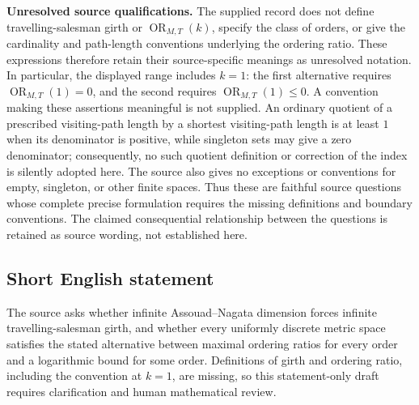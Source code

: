 \documentclass[11pt]{article}
\begin{document}
\textbf{Unresolved source qualifications.} The supplied record does not define travelling-salesman girth or \(\operatorname{OR}_{M,T}(k)\), specify the class of orders, or give the cardinality and path-length conventions underlying the ordering ratio. These expressions therefore retain their source-specific meanings as unresolved notation. In particular, the displayed range includes \(k=1\): the first alternative requires \(\operatorname{OR}_{M,T}(1)=0\), and the second requires \(\operatorname{OR}_{M,T}(1)\leq0\). A convention making these assertions meaningful is not supplied. An ordinary quotient of a prescribed visiting-path length by a shortest visiting-path length is at least \(1\) when its denominator is positive, while singleton sets may give a zero denominator; consequently, no such quotient definition or correction of the index is silently adopted here. The source also gives no exceptions or conventions for empty, singleton, or other finite spaces. Thus these are faithful source questions whose complete precise formulation requires the missing definitions and boundary conventions. The claimed consequential relationship between the questions is retained as source wording, not established here.
\subsection{Short English statement}
The source asks whether infinite Assouad--Nagata dimension forces infinite travelling-salesman girth, and whether every uniformly discrete metric space satisfies the stated alternative between maximal ordering ratios for every order and a logarithmic bound for some order. Definitions of girth and ordering ratio, including the convention at \(k=1\), are missing, so this statement-only draft requires clarification and human mathematical review.
\end{document}

